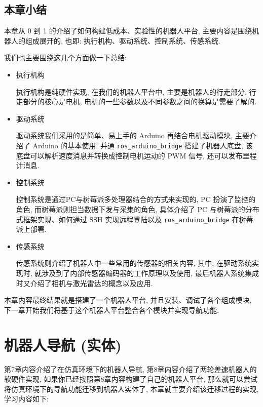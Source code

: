 \documentclass[openany, fontset=windowsold]{ctexbook}
\theoremstyle{kaiti}
\theoremstyle{normal}
\begin{document}
\section{本章小结}

本章从 0 到 1 的介绍了如何构建低成本、实验性的机器人平台, 主要内容是围绕机器人的组成展开的, 也即: 执行机构、驱动系统、控制系统、传感系统.

我们也主要围绕这几个方面做一下总结:

\begin{itemize}
  \item 执行机构

  执行机构是纯硬件实现, 在我们的机器人平台中, 主要是机器人的行走部分, 行走部分的核心是电机, 电机的一些参数以及不同参数之间的换算是需要了解的.
  
  \item 驱动系统
  
  驱动系统我们采用的是简单、易上手的 Arduino 再结合电机驱动模块, 主要介绍了 Arduino 的基本使用, 并通 \verb|ros_arduino_bridge| 搭建了机器人底盘, 该底盘可以解析速度消息并转换成控制电机运动的 PWM 信号, 还可以发布里程计消息.
  
  \item 控制系统
  
  控制系统是通过PC与树莓派多处理器结合的方式来实现的, PC 扮演了监控的角色, 而树莓派则担当数据下发与采集的角色, 具体介绍了 PC 与树莓派的分布式框架实现、如何通过 SSH 实现远程登陆以及 \verb|ros_arduino_bridge| 在树莓派上部署.
  
  \item 传感系统
  
  传感系统则介绍了机器人中一些常用的传感器的相关内容, 其中, 在驱动系统实现时, 就涉及到了内部传感器编码器的工作原理以及使用, 最后机器人系统集成时又介绍了相机与激光雷达的概念以及应用.
\end{itemize}

本章内容最终结果就是搭建了一个机器人平台, 并且安装、调试了各个组成模块, 下一章开始我们将基于这个机器人平台整合各个模块并实现导航功能.

\chapter{机器人导航 (实体)}
\label{chapter:robot_navigation_real}

第7章内容介绍了在仿真环境下的机器人导航, 第8章内容介绍了两轮差速机器人的软硬件实现, 如果你已经按照第8章内容构建了自己的机器人平台, 那么就可以尝试将仿真环境下的导航功能迁移到机器人实体了, 本章就主要介绍该迁移过程的实现, 学习内容如下: 
\end{document}
